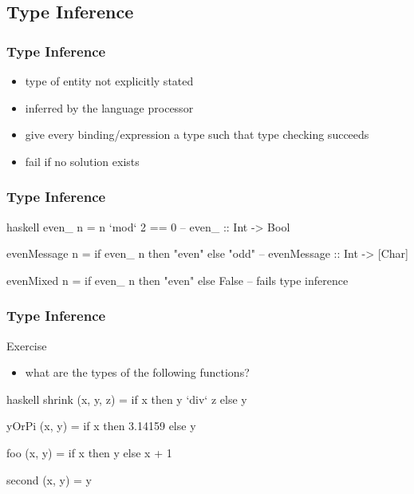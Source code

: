 \documentclass[dvipsnames]{beamer}
\theoremstyle{plain}
\begin{document}
\subsection{Type Inference}

\begin{frame}
  \frametitle{Type Inference}

  \begin{itemize}
    \item type of entity not explicitly stated
    \item inferred by the language processor

    \pause
    \medskip
    \item give every binding/expression a type such that type checking succeeds
    \item fail if no solution exists
  \end{itemize}
\end{frame}

\begin{frame}[fragile]
  \frametitle{Type Inference}

  \begin{example}[Haskell]
    \begin{pygments}{haskell}
even_ n = n `mod` 2 == 0
-- even_ :: Int -> Bool

evenMessage n = if even_ n then "even" else "odd"
-- evenMessage :: Int -> [Char]

evenMixed n = if even_ n then "even" else False
-- fails type inference
    \end{pygments}
  \end{example}
\end{frame}

\begin{frame}[fragile]
  \frametitle{Type Inference}

  \begin{block}{Exercise}
    \begin{itemize}
      \item what are the types of the following functions?
    \end{itemize}

    \medskip
    \begin{pygments}{haskell}
shrink (x, y, z) = if x then y `div` z else y

yOrPi (x, y) = if x then 3.14159 else y

foo (x, y) = if x then y else x + 1

second (x, y) = y
    \end{pygments}
  \end{block}
\end{frame}
\end{document}
